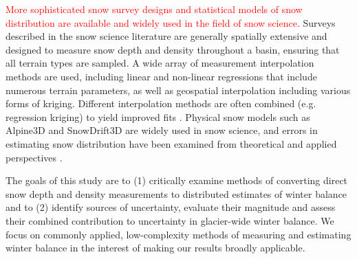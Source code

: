 \documentclass[twocolumn, letterpaper]{igs}
\begin{document}
\textcolor{red}{More sophisticated snow survey designs and statistical models of snow distribution are available and widely used in the field of snow science.} Surveys described in the snow science literature are generally spatially extensive and designed to measure snow depth and density throughout a basin, ensuring that all terrain types are sampled. A wide array of measurement interpolation methods are used, including linear \citep[e.g.][]{Lopez2010} and non-linear regressions \citep[e.g.][]{Molotch2005} that include numerous terrain parameters, as well as geospatial interpolation \citep[e.g.][]{Erxleben2002} including various forms of  kriging. Different interpolation methods are often combined (e.g. regression kriging) to yield improved fits \citep[e.g.][]{Balk2000}. Physical snow models such as Alpine3D \citep{Lehning2006} and SnowDrift3D \citep{Schneiderbauer2011} are widely used in snow science, and errors in estimating snow distribution have been examined from theoretical \citep[e.g.][]{Trujillo2015} and applied perspectives \citep[e.g.][]{Turcan1975,Woo1978, Deems2006}. 

The goals of this study are to (1) critically examine methods of converting direct snow depth and density measurements to distributed estimates of winter balance and to (2) identify sources of uncertainty, evaluate their magnitude and assess their combined contribution to uncertainty in glacier-wide winter balance. We focus on commonly applied, low-complexity methods of measuring and estimating winter balance in the interest of making our results broadly applicable.
\end{document}
